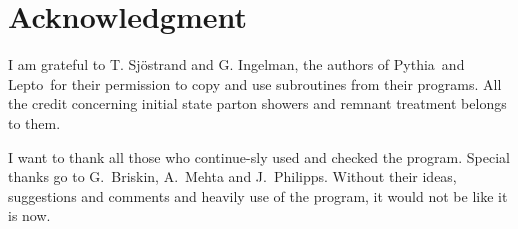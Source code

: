 \documentclass[10pt]{article} \usepackage{dina4}
\def\LEPTO{{\sc Lepto}}
\def\PYTHIA{{\sc Pythia}}
\begin{document}
\section{Acknowledgment}
I am grateful to T. Sj\"ostrand and G. Ingelman, the authors of \PYTHIA\ and 
\LEPTO\ for their permission to copy and use subroutines from their programs.
All the credit concerning initial state parton showers and remnant treatment
belongs to them.
\par
I want to thank all those who continue-sly used and checked the program.
Special thanks go to G.~Briskin, A.~Mehta and J.~Philipps. Without
their ideas, suggestions and comments and heavily use of the program, it
would not be like it is now.

%
%
\end{document}
